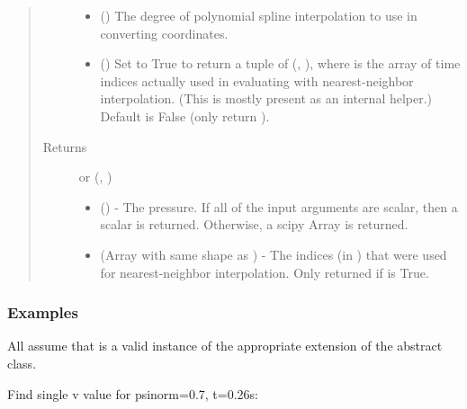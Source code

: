 \documentclass[letterpaper,10pt,english]{sphinxmanual}
\begin{document}
\begin{fulllineitems}
\begin{fulllineitems}
\begin{quote}
\begin{description}
\begin{itemize}
\item {} 
 () \textendash{} The degree of polynomial spline interpolation to
use in converting coordinates.

\item {} 
 () \textendash{} Set to True to return a tuple of (,
), where  is the array of time indices
actually used in evaluating  with nearest-neighbor
interpolation. (This is mostly present as an internal helper.)
Default is False (only return ).

\end{itemize}

\item[{Returns}] \leavevmode

 or (, )
\begin{itemize}
\item {} 
 () - The pressure. If
all of the input arguments are scalar, then a scalar is returned.
Otherwise, a scipy Array is returned.

\item {} 
 (Array with same shape as ) - The indices
(in ) that were used for
nearest-neighbor interpolation. Only returned if  is
True.

\end{itemize}


\end{description}\end{quote}
\subsubsection*{Examples}

All assume that  is a valid instance of the appropriate
extension of the {\hyperref[\detokenize{eqtools:eqtools.core.Equilibrium}]{}} abstract class.

Find single v value for psinorm=0.7, t=0.26s:

\begin{sphinxVerbatim}[commandchars=\\\{\}]
   
\end{sphinxVerbatim}


\end{fulllineitems}
\end{fulllineitems}
\end{document}
